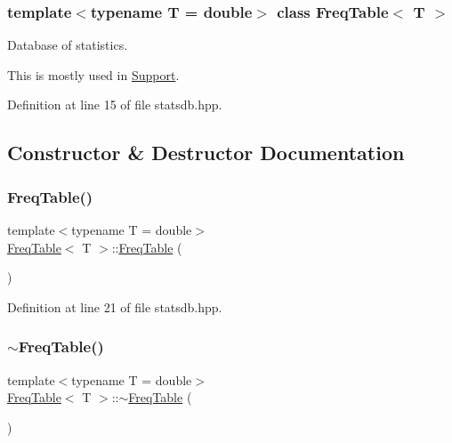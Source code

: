 \subsubsection*{template$<$typename T = double$>$\newline
class Freq\+Table$<$ T $>$}

Database of statistics. 

This is mostly used in {\ttfamily \hyperlink{class_support}{Support}}. 

Definition at line 15 of file statsdb.\+hpp.



\subsection{Constructor \& Destructor Documentation}
\mbox{\label{class_freq_table_a2fdea53e35f9a301d7d1bbf6b7da5f41}} 
\subsubsection{\texorpdfstring{Freq\+Table()}{FreqTable()}}
{\footnotesize\ttfamily template$<$typename T = double$>$ \\
\hyperlink{class_freq_table}{Freq\+Table}$<$ T $>$\+::\hyperlink{class_freq_table}{Freq\+Table} (\begin{DoxyParamCaption}{ }\end{DoxyParamCaption})\hspace{0.3cm}{\ttfamily [inline]}}



Definition at line 21 of file statsdb.\+hpp.

\mbox{\label{class_freq_table_a7ed627807a61c484243636137609abcd}} 
\subsubsection{\texorpdfstring{$\sim$\+Freq\+Table()}{~FreqTable()}}
{\footnotesize\ttfamily template$<$typename T = double$>$ \\
\hyperlink{class_freq_table}{Freq\+Table}$<$ T $>$\+::$\sim$\hyperlink{class_freq_table}{Freq\+Table} (\begin{DoxyParamCaption}{ }\end{DoxyParamCaption})\hspace{0.3cm}{\ttfamily [inline]}}



